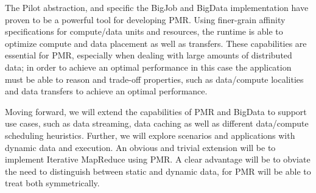 \documentclass{sig-alternate}
\newcommand{\jhanote}[1]{ {\textcolor{red} { ***SJ: #1 }}}
\newcommand{\jhanote}[1]{}
\newcommand{\upp}{\vspace*{-0.5em}}
\begin{document}
The Pilot abstraction, and specific the BigJob and BigData
implementation have proven to be a powerful tool for developing
PMR. Using finer-grain affinity specifications for compute/data units
and resources, the runtime is able to optimize compute and data
placement as well as transfers. These capabilities are essential for
PMR, especially when dealing with large amounts of distributed data;
in order to achieve an optimal performance in this case the
application must be able to reason and trade-off properties, such as
data/compute localities and data transfers to achieve an optimal
performance.

Moving forward, we will extend the capabilities of PMR and BigData to
support use cases, such as data streaming, data caching as well as
different data/compute scheduling heuristics. Further, we will explore
scenarios and applications with dynamic data and execution. An obvious
and trivial extension will be to implement Iterative MapReduce using
PMR. A clear advantage will be to obviate the need to distinguish
between static and dynamic data, for PMR will be able to treat both
symmetrically.  \upp





%
%
%
\end{document}
